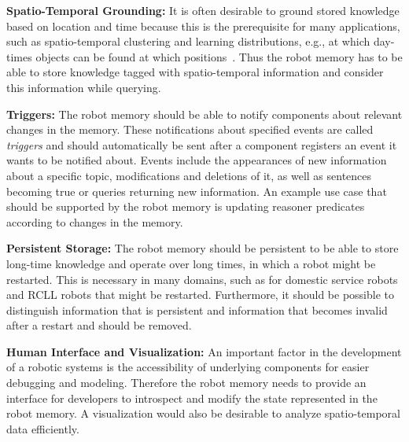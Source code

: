 \textbf{Spatio-Temporal Grounding:} It is often desirable to ground
stored knowledge based on location and time because this is the
prerequisite for many applications, such as spatio-temporal clustering
and learning distributions, e.g., at which day-times objects can be
found at which positions~\cite{deebul}. Thus the robot
memory has to be able to store knowledge tagged with spatio-temporal
information and consider this information while querying.

\textbf{Triggers:} The robot memory should be able to notify
components about relevant changes in the memory. These notifications
about specified events are called \emph{triggers} and should
automatically be sent after a component registers an event it wants to
be notified about. Events include the appearances of new information
about a specific topic, modifications and deletions of it, as well as
sentences becoming true or queries returning new information.
An example use case that should be supported by the robot memory is
updating reasoner predicates according to changes in the memory.

\textbf{Persistent Storage:} The robot memory should be persistent
to be able to store long-time knowledge and operate over long times,
in which a robot might be restarted. This is necessary in many
domains, such as for domestic service robots and RCLL robots that
might be restarted. Furthermore, it should be possible to distinguish
information that is persistent and information that becomes invalid
after a restart and should be removed.

\textbf{Human Interface and Visualization:} An important factor in the
development of a robotic systems is the accessibility of underlying
components for easier debugging and modeling. Therefore the robot
memory needs to provide an interface for developers to introspect and
modify the state represented in the robot memory. A visualization
would also be desirable to analyze spatio-temporal data efficiently.

